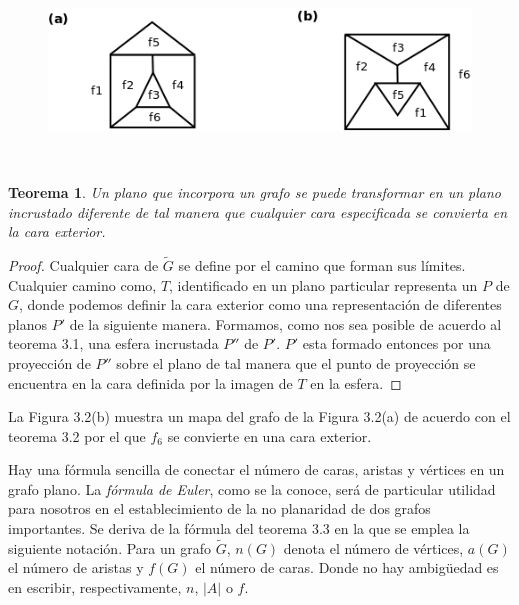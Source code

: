 \documentclass[10pt,a5paper]{book}
\newtheorem{teorema}{Teorema}[chapter]
\begin{document}
\begin{figure}[H]
\caption{ }
\hrulefill{}\\
\includegraphics[scale=.4]{Fig3_2.png}
\end{figure}
\hrulefill{}\\

\begin{teorema}
Un plano que incorpora un grafo se puede transformar en un plano incrustado diferente de tal manera que cualquier cara especificada se convierta en la cara exterior.
\end{teorema}
\begin{proof}
Cualquier cara de $\widetilde{G}$ se define por el camino que forman sus límites. Cualquier camino como, $T$, identificado en un plano particular representa un $P$ de $G$, donde podemos definir la cara exterior como una representación de diferentes planos $P'$ de la siguiente manera. Formamos, como nos sea posible de acuerdo al teorema 3.1, una esfera incrustada $P''$ de $P'$. $P'$ esta formado entonces por una proyección de $P''$ sobre el plano de tal manera que el punto de proyección se encuentra en la cara definida por la imagen de $T$ en la esfera.
\end{proof}

La Figura 3.2(b) muestra un mapa del grafo de la Figura 3.2(a) de acuerdo con el teorema 3.2 por el que $f_6$ se convierte en una cara exterior.

Hay una fórmula sencilla de conectar el número de caras, aristas y vértices en un grafo plano. La \emph{fórmula de Euler}, como se la conoce, será de particular utilidad para nosotros en el establecimiento de la no planaridad de dos grafos importantes. Se deriva de la fórmula del teorema 3.3 en la que se emplea la siguiente notación. Para un grafo $\widetilde{G}$, $n(G)$ denota el número de vértices, $a(G)$ el número de aristas y $f(G)$ el número de caras. Donde no hay ambigüedad es en escribir, respectivamente, $n$, $|A|$ o $f$.
\end{document}
